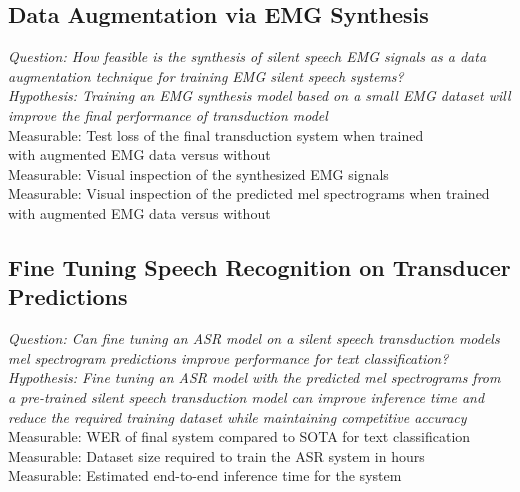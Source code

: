 \subsection{Data Augmentation via EMG Synthesis}
\textit{Question: How feasible is the synthesis of silent speech EMG signals
as a data augmentation technique for training EMG silent speech systems?} \\
\textit{Hypothesis: Training an EMG synthesis model based on a small
EMG dataset will improve the final performance of transduction model} \\
Measurable: Test loss of the final transduction system when trained\\
with augmented EMG data versus without\\
Measurable: Visual inspection of the synthesized EMG signals\\
Measurable: Visual inspection of the predicted mel spectrograms when
trained with augmented EMG data versus without\\

\subsection{Fine Tuning Speech Recognition on Transducer Predictions }
\textit{Question: Can fine tuning an ASR model on a silent speech
transduction models mel spectrogram predictions improve performance for
text classification?} \\
\textit{Hypothesis: Fine tuning an ASR model with the predicted
mel spectrograms from a pre-trained silent speech transduction model
can improve inference time and reduce the required training dataset
while maintaining competitive accuracy} \\
Measurable: WER of final system compared to SOTA for text classification \\
Measurable: Dataset size required to train the ASR system in hours \\
Measurable: Estimated end-to-end inference time for the system